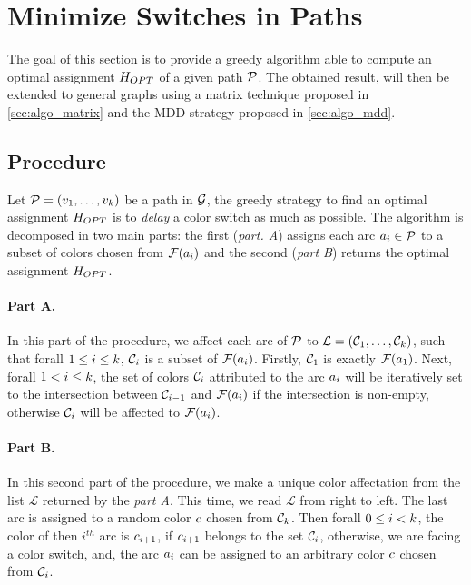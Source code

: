 \section{Minimize Switches in Paths}

The goal of this section is to provide a greedy algorithm able to compute an optimal assignment $H_{OPT}$ of a given path $\mathcal{P}$. The obtained result, will then be extended to general graphs using a matrix technique proposed in \cref{sec:algo_matrix} and the MDD strategy proposed in \cref{sec:algo_mdd}.

\subsection{Procedure}
\label{sec:path_proc}

Let $\mathcal{P} = (v_1,\ldots,v_{k})$ be a path in $\mathcal{G}$, the greedy strategy to find an optimal assignment $H_{OPT}$ is to \textit{delay} a color switch as much as possible. The algorithm is decomposed in two main parts: the first (\textit{part. A}) assigns each arc $a_i \in \mathcal{P}$ to a subset of colors chosen from $\mathcal{F}(a_i)$ and the second (\textit{part B}) returns the optimal assignment $H_{OPT}$.

\paragraph{Part A.}
In this part of the procedure, we affect each arc of $\mathcal{P}$ to $\mathcal{L} = (\mathcal{C}_1,\ldots,\mathcal{C}_{k})$, such that forall $1 \leq i \leq k$, $\mathcal{C}_i$ is a subset of $\mathcal{F}(a_i)$. Firstly, $\mathcal{C}_1$ is exactly $\mathcal{F}(a_1)$. Next, forall $1 < i \leq k$, the set of colors $\mathcal{C}_i$ attributed to the arc $a_i$ will be iteratively set to the intersection between $\mathcal{C}_{i-1}$ and $\mathcal{F}(a_i)$ if the intersection is non-empty, otherwise $\mathcal{C}_i$ will be affected to $\mathcal{F}(a_i)$.

\paragraph{Part B.}
In this second part of the procedure, we make a unique color affectation from the list $\mathcal{L}$ returned by the \textit{part A}. This time, we read $\mathcal{L}$ from right to left. The last arc is assigned to a random color $c$ chosen from $\mathcal{C}_k$. Then forall $0 \leq i < k$, the color of then $i^{th}$ arc is $c_{i+1}$, if $c_{i+1}$ belongs to the set $\mathcal{C}_i$, otherwise, we are facing a color switch, and, the arc $a_i$ can be assigned to an arbitrary color $c$ chosen from $\mathcal{C}_i$.

